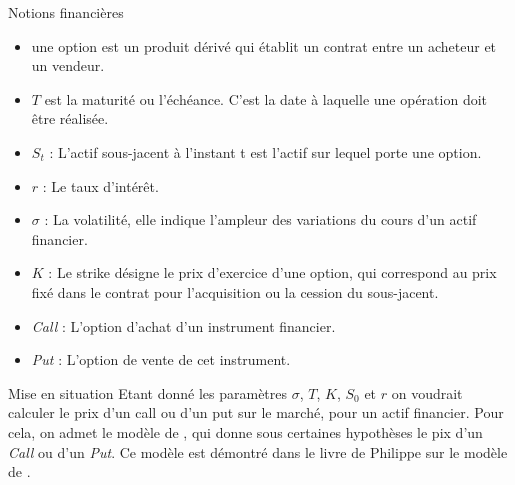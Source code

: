 \documentclass[final]{beamer}
\newlength{\onecolwid}
\begin{document}
\begin{frame}[t]
\begin{columns}[t]
\begin{column}{\onecolwid}
\vspace{2cm}
\begin{block}{Notions financières}
  \begin{itemize}
    \item une option est un produit dérivé qui établit un contrat entre un acheteur et un vendeur.
    \item $T$ est la maturité ou l'échéance. C'est la date à laquelle une opération doit être réalisée.
    \item $S_t$ : L'actif sous-jacent à l'instant t est l'actif sur lequel porte une option.
    \item $r$ : Le taux d'intérêt.
    \item $\sigma$ : La volatilité, elle indique l'ampleur des variations du cours d'un actif financier.
    \item $K$ : Le strike désigne le prix d'exercice d'une option, qui correspond au prix fixé dans le contrat pour l’acquisition ou la cession du sous-jacent.
    \item \textit{Call} : L'option d'achat d'un instrument financier.
    \item \textit{Put} : L'option de vente de cet instrument.
  \end{itemize}
  \vspace{2cm}
  \begin{alertblock}{Mise en situation}
    Etant donné les paramètres $\sigma$, $T$, $K$, $S_0$ et $r$ on voudrait calculer le prix d'un call ou d'un put sur le marché, pour un actif financier.
    \newline
    Pour cela, on admet le modèle de , qui donne sous certaines hypothèses le pix d'un \textit{Call} ou d'un \textit{Put}. Ce modèle est démontré dans le livre de Philippe   sur le modèle de .
    \newline
  \end{alertblock}
\end{block}




\end{column} %


\end{columns}
\end{frame}
\end{document}
